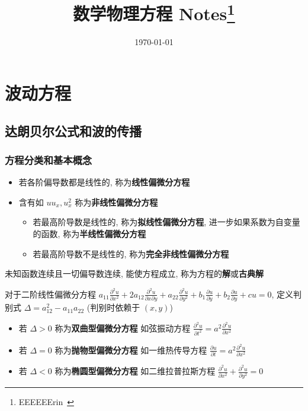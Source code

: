 \documentclass[10pt]{yerbaformat}
\title{数学物理方程 Notes\footnote{EEEEEErin~}}
\date{\today}
\begin{document}
\author{}
\footnotesize

\section{波动方程}

\subsection{达朗贝尔公式和波的传播}

\subsubsection{方程分类和基本概念}

\begin{itemize}
    \item 若各阶偏导数都是线性的, 称为\textbf{线性偏微分方程}
    \item 含有如 $uu_{x}, u_{x}^{2}$ 称为\textbf{非线性偏微分方程}
          \begin{itemize}
              \item 若最高阶导数是线性的, 称为\textbf{拟线性偏微分方程}, 进一步如果系数为自变量的函数, 称为\textbf{半线性偏微分方程}
              \item 若最高阶导数不是线性的, 称为\textbf{完全非线性偏微分方程}
          \end{itemize}
\end{itemize}

\par 未知函数连续且一切偏导数连续, 能使方程成立, 称为方程的\textbf{解}或\textbf{古典解}

\par 对于二阶线性偏微分方程 $a_{11} \frac{\partial^{2} u}{\partial x^{2}}+2 a_{12} \frac{\partial^{2} u}{\partial x \partial y}+a_{22} \frac{\partial^{2} u}{\partial y^{2}}+b_{1} \frac{\partial u}{\partial y}+b_{2} \frac{\partial u}{\partial y}+c u=0$, 定义判别式 $\Delta=a_{12}^{2}-a_{11} a_{22}$ (判别时依赖于 $(x,y)$)

\begin{itemize}
    \item 若 $\Delta>0$ 称为\textbf{双曲型偏微分方程} 如弦振动方程 $\frac{\partial^{2} u}{\partial t^{2}}=a^{2} \frac{\partial^{2} u}{\partial x^{2}}$
    \item 若 $\Delta=0$ 称为\textbf{抛物型偏微分方程} 如一维热传导方程 $\frac{\partial u}{\partial t}=a^{2} \frac{\partial^{2} u}{\partial x^{2}}$
    \item 若 $\Delta<0$ 称为\textbf{椭圆型偏微分方程} 如二维拉普拉斯方程 $\frac{\partial^{2} u}{\partial x^{2}}+\frac{\partial^{2} u}{\partial y^{2}}=0$
\end{itemize}
\end{document}
